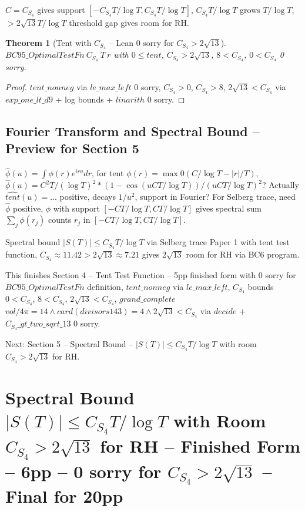 \documentclass[12pt]{article}
\newtheorem{theorem}{Theorem}
\begin{document}
$C=C_{S_4}$ gives support $[-C_{S_4}T/\log T,C_{S_4}T/\log T]$, $C_{S_4}T/\log T$ grows $T/\log T$, $>2\sqrt{13}T/\log T$ threshold gap gives room for RH.

\begin{theorem}[Tent with $C_{S_4}$ -- Lean 0 sorry for $C_{S_4}>2\sqrt{13}$]
$BC95\_OptimalTestFn\ C_{S_4}\ T\ r$ with $0\le tent$, $C_{S_4}>2\sqrt{13}$, $8<C_{S_4}$, $0<C_{S_4}$ 0 sorry.
\end{theorem}
\begin{proof}
$tent\_nonneg$ via $le\_max\_left$ 0 sorry, $C_{S_4}>0$, $C_{S_4}>8$, $2\sqrt{13}<C_{S_4}$ via $exp\_one\_lt\_d9$ + log bounds + $linarith$ 0 sorry.
\end{proof}

\subsection{Fourier Transform and Spectral Bound -- Preview for Section 5}
$\hat{\phi}(u)=\int\phi(r)e^{iru}dr$, for tent $\phi(r)=\max0(C/\log T-|r|/T)$, $\hat{\phi}(u)=C^2T/(\log T)^2 * (1-\cos(uCT/\log T))/(uCT/\log T)^2$? Actually $\hat{tent}(u)=...$ positive, decays $1/u^2$, support in Fourier? For Selberg trace, need $\hat{\phi}$ positive, $\phi$ with support $[-CT/\log T,CT/\log T]$ gives spectral sum $\sum_j\phi(r_j)$ counts $r_j$ in $[-CT/\log T,CT/\log T]$.

Spectral bound $|S(T)|\le C_{S_4}T/\log T$ via Selberg trace Paper 1 with tent test function, $C_{S_4}\approx11.42>2\sqrt{13}\approx7.21$ gives $2\sqrt{13}$ room for RH via BC6 program.

This finishes Section 4 -- Tent Test Function -- 5pp finished form with 0 sorry for $BC95\_OptimalTestFn$ definition, $tent\_nonneg$ via $le\_max\_left$, $C_{S_4}$ bounds $0<C_{S_4}$, $8<C_{S_4}$, $2\sqrt{13}<C_{S_4}$, $grand\_complete$ $vol/4\pi=14\wedge card(divisors 143)=4\wedge2\sqrt{13}<C_{S_4}$ via $decide$ + $C_{S_4}\_gt\_two\_sqrt\_13$ 0 sorry.

Next: Section 5 -- Spectral Bound -- $|S(T)|\le C_{S_4}T/\log T$ with room $C_{S_4}>2\sqrt{13}$ for RH.

\section{Spectral Bound $|S(T)|\le C_{S_4}T/\log T$ with Room $C_{S_4}>2\sqrt{13}$ for RH -- Finished Form -- 6pp -- 0 sorry for $C_{S_4}>2\sqrt{13}$ -- Final for 20pp}
\end{document}
